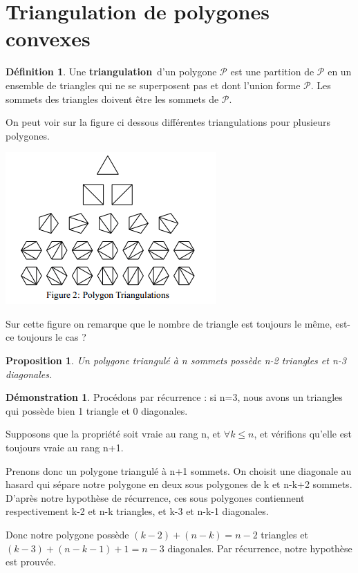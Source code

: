 \documentclass[a4paper]{article}
\theoremstyle{plain}
\newtheorem{prop}[thm]{Proposition}
\theoremstyle{definition}
\newtheorem{defn}{Définition}[section]
\theoremstyle{proof}
\newtheorem{dem}{Démonstration}
\theoremstyle{remark}
\begin{document}
\section{Triangulation de polygones convexes}
\begin{defn}
Une \textbf{triangulation}\ d'un polygone $\mathcal{P}$ est une partition de $\mathcal{P}$ en un ensemble de triangles qui ne se superposent pas et dont l'union forme $\mathcal{P}$. Les sommets des triangles doivent être les sommets de $\mathcal{P}$.
\end{defn}

On peut voir sur la figure ci dessous différentes triangulations pour plusieurs polygones.
\begin{center}
\includegraphics[]{triangulation.jpg}
\end{center}

Sur cette figure on remarque que le nombre de triangle est toujours le même, est-ce toujours le cas ?

\begin{prop}
Un polygone triangulé à n sommets possède n-2 triangles et n-3 diagonales.
\end{prop}

\begin{dem}
Procédons par récurrence : si n=3, nous avons un triangles qui possède bien 1 triangle et 0 diagonales.

Supposons que la propriété soit vraie au rang n, et $\forall k\le n$, et vérifions qu'elle est toujours vraie au rang n+1.

Prenons donc un polygone triangulé à n+1 sommets. On choisit une diagonale au hasard qui sépare notre polygone en deux sous polygones de k et n-k+2 sommets. D'après notre hypothèse de récurrence, ces sous polygones contiennent respectivement k-2 et n-k triangles, et k-3 et n-k-1 diagonales.

Donc notre polygone possède $(k-2)+(n-k)=n-2$ triangles et $(k-3)+(n-k-1)+1=n-3$ diagonales.
Par récurrence, notre hypothèse est prouvée.
\end{dem}
\end{document}
